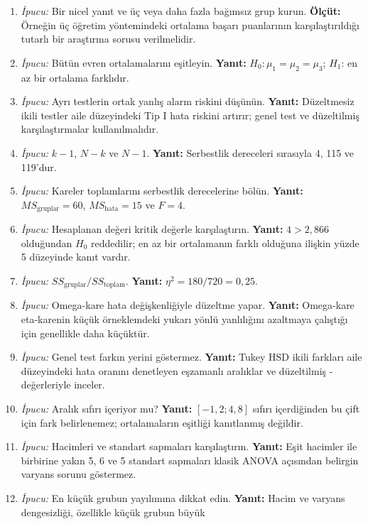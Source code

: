 \begin{enumerate}[leftmargin=*,itemsep=5pt]
\item \emph{İpucu:} Bir nicel yanıt ve üç veya daha fazla bağımsız grup kurun.
\textbf{Ölçüt:} Örneğin üç öğretim yöntemindeki ortalama başarı puanlarının
karşılaştırıldığı tutarlı bir araştırma sorusu verilmelidir.
\item \emph{İpucu:} Bütün evren ortalamalarını eşitleyin.
\textbf{Yanıt:} $H_0:\mu_1=\mu_2=\mu_3$; $H_1$: en az bir ortalama farklıdır.
\item \emph{İpucu:} Ayrı testlerin ortak yanlış alarm riskini düşünün.
\textbf{Yanıt:} Düzeltmesiz ikili testler aile düzeyindeki Tip I hata riskini
artırır; genel test ve düzeltilmiş karşılaştırmalar kullanılmalıdır.
\item \emph{İpucu:} $k-1$, $N-k$ ve $N-1$.
\textbf{Yanıt:} Serbestlik dereceleri sırasıyla 4, 115 ve 119'dur.
\item \emph{İpucu:} Kareler toplamlarını serbestlik derecelerine bölün.
\textbf{Yanıt:} $MS_{\mathrm{gruplar}}=60$,
$MS_{\mathrm{hata}}=15$ ve $F=4$.
\item \emph{İpucu:} Hesaplanan değeri kritik değerle karşılaştırın.
\textbf{Yanıt:} $4>2{,}866$ olduğundan $H_0$ reddedilir; en az bir ortalamanın
farklı olduğuna ilişkin yüzde 5 düzeyinde kanıt vardır.
\item \emph{İpucu:} $SS_{\mathrm{gruplar}}/SS_{\mathrm{toplam}}$.
\textbf{Yanıt:} $\eta^2=180/720=0{,}25$.
\item \emph{İpucu:} Omega-kare hata değişkenliğiyle düzeltme yapar.
\textbf{Yanıt:} Omega-kare eta-karenin küçük örneklemdeki yukarı yönlü
yanlılığını azaltmaya çalıştığı için genellikle daha küçüktür.
\item \emph{İpucu:} Genel test farkın yerini göstermez.
\textbf{Yanıt:} Tukey HSD ikili farkları aile düzeyindeki hata oranını
denetleyen eşzamanlı aralıklar ve düzeltilmiş \pval-değerleriyle inceler.
\item \emph{İpucu:} Aralık sıfırı içeriyor mu?
\textbf{Yanıt:} $[-1{,}2;4{,}8]$ sıfırı içerdiğinden bu çift için fark
belirlenemez; ortalamaların eşitliği kanıtlanmış değildir.
\item \emph{İpucu:} Hacimleri ve standart sapmaları karşılaştırın.
\textbf{Yanıt:} Eşit hacimler ile birbirine yakın 5, 6 ve 5 standart
sapmaları klasik ANOVA açısından belirgin varyans sorunu göstermez.
\item \emph{İpucu:} En küçük grubun yayılımına dikkat edin.
\textbf{Yanıt:} Hacim ve varyans dengesizliği, özellikle küçük grubun büyük

\end{enumerate}
